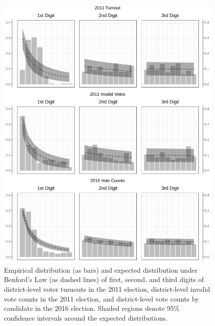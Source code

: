\documentclass[12pt]{article}\usepackage[]{graphicx}\usepackage[]{color}
\newcommand{\1}{\mathbbm{1}}
\begin{document}
\label{app:benford}
\begin{figure}[!htbp]
	\centering
	\includegraphics[width=\textwidth]{figure/BENFORD_DIGIT_TEST.png}
	\caption[Digit Test of Election Results]{Empirical distribution (as bars) and expected distribution under Benford's Law (as dashed lines) of first, second, and third digits of district-level voter turnouts in the 2011 election, district-level invalid vote counts in the 2011 election, and district-level vote counts by candidate in the 2016 election. Shaded regions denote 95\% confidence intervals around the expected distributions.}
	\label{fig:Benford}
\end{figure}
\end{document}
